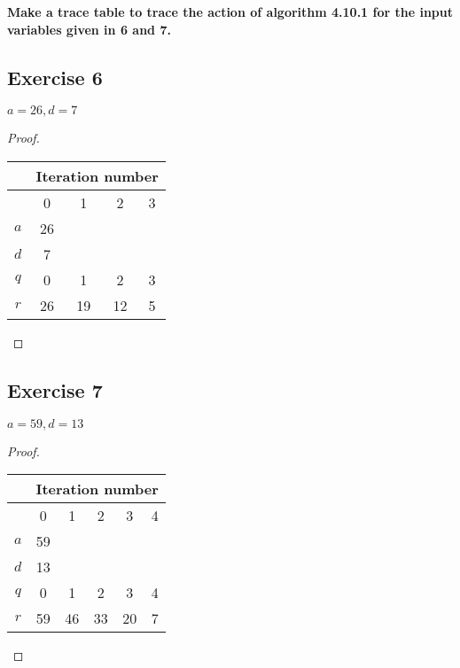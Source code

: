 \documentclass[14pt]{extarticle}
\newcommand{\cy}{\color{cyan}}
\begin{document}
{\bf \cy Make a trace table to trace the action of algorithm 4.10.1 for the input variables given in 6 and 7.}

\subsection{Exercise 6}
$a = 26, d = 7$

\begin{proof}
    \begin{center}
        \begin{tabular}{|c|c|c|c|c|}
            \hline
                & \multicolumn{4}{c|}{{\bf \cy Iteration number}}               \\
            \hline
                & 0                                               & 1  & 2  & 3 \\
            \hline
            $a$ & 26                                              &    &    &   \\
            \hline
            $d$ & 7                                               &    &    &   \\
            \hline
            $q$ & 0                                               & 1  & 2  & 3 \\
            \hline
            $r$ & 26                                              & 19 & 12 & 5 \\
            \hline
        \end{tabular}
    \end{center}
\end{proof}

\subsection{Exercise 7}
$a = 59, d = 13$

\begin{proof}
    \begin{center}
        \begin{tabular}{|c|c|c|c|c|c|}
            \hline
                & \multicolumn{5}{c|}{{\bf \cy Iteration number}}                    \\
            \hline
                & 0                                               & 1  & 2  & 3  & 4 \\
            \hline
            $a$ & 59                                              &    &    &    &   \\
            \hline
            $d$ & 13                                              &    &    &    &   \\
            \hline
            $q$ & 0                                               & 1  & 2  & 3  & 4 \\
            \hline
            $r$ & 59                                              & 46 & 33 & 20 & 7 \\
            \hline
        \end{tabular}
    \end{center}
\end{proof}
\end{document}
